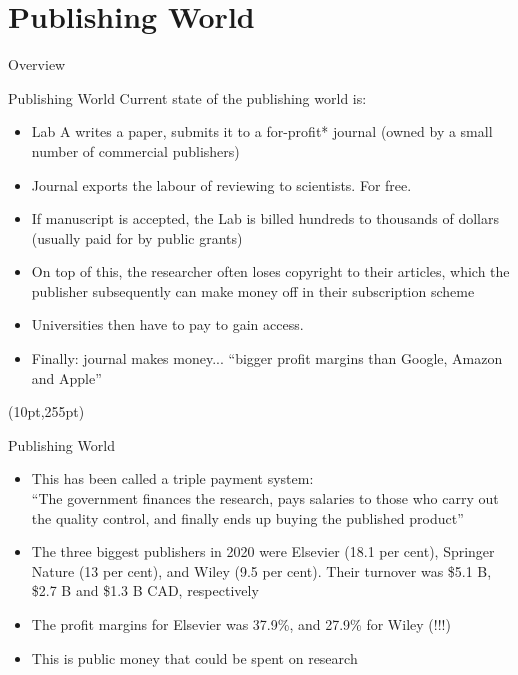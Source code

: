 \documentclass{beamer}
\begin{document}

\section{Publishing World}
\begin{frame}{Overview}
\end{frame}
\begin{frame}{Publishing World}
	Current state of the publishing world is:
	\begin{itemize}
		\item<2-> Lab A writes a paper, submits it to a for-profit* journal (owned by a small number of commercial publishers)
		\item<3-> Journal exports the labour of reviewing to scientists. For free.
		\item<4-> If manuscript is accepted, the Lab is billed hundreds to thousands of dollars (usually paid for by public grants)
		\item<5-> On top of this, the researcher often loses copyright to their articles, which the publisher subsequently can make money off in their subscription scheme
		\item<6-> Universities then have to pay to gain access.
		\item<7-> Finally: journal makes money... ``bigger profit margins than Google, Amazon and Apple''
	\end{itemize}
	
	\begin{textblock*}{300pt}(10pt,255pt)
		\onslide<2->{\tiny{*: usually}}
	
	\end{textblock*}
		
\end{frame}

\begin{frame}{Publishing World}
\begin{itemize}
	\item This has been called a triple payment system: \\``The government finances the research, pays salaries to those who carry out the quality control, and finally ends up buying the published product''
	\item<2-> The three biggest publishers in 2020 were Elsevier (18.1 per cent), Springer Nature (13 per cent), and Wiley (9.5 per cent). Their turnover was \$5.1 B, \$2.7 B and \$1.3 B CAD, respectively
	\item<3-> The profit margins for Elsevier was 37.9\%, and 27.9\% for Wiley (!!!)
	\item<4-> This is public money that could be spent on research
\end{itemize}
	
\end{frame}
\end{document}

